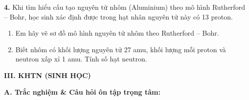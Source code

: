 \documentclass[13pt,a4paper]{article}
\begin{document}
\begin{center}
\end{center}
\par\vspace{1pt}\noindent
\dotfill\par\vspace{4pt}\noindent\dotfill\par\vspace{4pt}\noindent\dotfill\par\vspace{4pt}\noindent\dotfill\par\vspace{4pt}\noindent
\textbf{4.} Khi tìm hiểu cấu tạo nguyên tử nhôm (Aluminium) theo mô hình Rutherford – Bohr, học sinh xác định được trong hạt nhân nguyên tử này có 13 proton.
\begin{enumerate}[label=\alph*.,leftmargin=1.5cm,itemsep=1pt]
  \item Em hãy vẽ sơ đồ mô hình nguyên tử nhôm theo Rutherford – Bohr.
  \item Biết nhôm có khối lượng nguyên tử 27 amu, khối lượng mỗi proton và neutron xấp xỉ 1 amu. Tính số hạt neutron.
\end{enumerate}

\begin{center}
\end{center}
\par\vspace{1pt}\noindent
\dotfill\par\vspace{4pt}\noindent\dotfill\par\vspace{4pt}\noindent\dotfill\par\vspace{4pt}\noindent\dotfill\par\vspace{4pt}\noindent
\vspace{6pt}
{\color{myGreen}\large\bfseries III. KHTN (SINH HỌC)}

\vspace{3pt}
{\color{mySub}\textbf{A. Trắc nghiệm \& Câu hỏi ôn tập trọng tâm:}}
\end{document}

